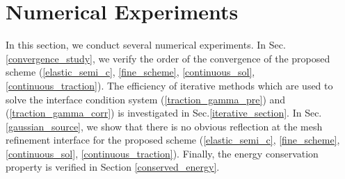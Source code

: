\section{Numerical Experiments}
In this section, we conduct several numerical experiments. In Sec.\ref{convergence_study}, we verify the order of the convergence of the proposed scheme (\ref{elastic_semi_c}, \ref{fine_scheme}, \ref{continuous_sol}, \ref{continuous_traction}). The efficiency of iterative methods which are used to solve the interface condition system (\ref{traction_gamma_pre}) and (\ref{traction_gamma_corr}) is investigated in Sec.\ref{iterative_section}. In Sec.\ref{gaussian_source}, we show that there is no obvious reflection at the mesh refinement interface for the proposed scheme (\ref{elastic_semi_c}, \ref{fine_scheme}, \ref{continuous_sol}, \ref{continuous_traction}). Finally, the energy conservation property is verified in Section \ref{conserved_energy}.